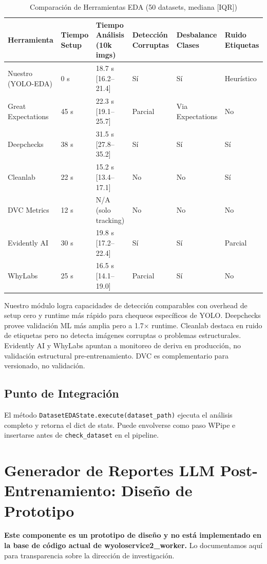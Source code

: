 \documentclass[10pt,twocolumn,letterpaper]{article}
\begin{document}
\begin{table}[htbp]
\centering
\caption{Comparación de Herramientas EDA (50 datasets, mediana [IQR])}
\label{tab:eda_compare}
\begin{tabular}{@{}llllll@{}}
\toprule
Herramienta & Tiempo Setup & Tiempo Análisis (10k imgs) & Detección Corruptas & Desbalance Clases & Ruido Etiquetas \\ \midrule
Nuestro (YOLO-EDA) & 0 s & 18.7 s [16.2--21.4] & Sí & Sí & Heurístico \\
Great Expectations & 45 s & 22.3 s [19.1--25.7] & Parcial & Via Expectations & No \\
Deepchecks & 38 s & 31.5 s [27.8--35.2] & Sí & Sí & Sí \\
Cleanlab & 22 s & 15.2 s [13.4--17.1] & No & No & Sí \\
DVC Metrics & 12 s & N/A (solo tracking) & No & No & No \\
Evidently AI & 30 s & 19.8 s [17.2--22.4] & Sí & Sí & Parcial \\
WhyLabs & 25 s & 16.5 s [14.1--19.0] & Parcial & Sí & No \\ \bottomrule
\end{tabular}
\end{table}

Nuestro módulo logra capacidades de detección comparables con overhead de setup cero y runtime más rápido para chequeos específicos de YOLO. Deepchecks provee validación ML más amplia pero a 1.7$\times$ runtime. Cleanlab destaca en ruido de etiquetas pero no detecta imágenes corruptas o problemas estructurales. Evidently AI y WhyLabs apuntan a monitoreo de deriva en producción, no validación estructural pre-entrenamiento. DVC es complementario para versionado, no validación.

\subsection{Punto de Integración}
El método \texttt{DatasetEDAState.execute(dataset\_path)} ejecuta el análisis completo y retorna el dict de stats. Puede envolverse como paso WPipe e insertarse antes de \texttt{check\_dataset} en el pipeline.

\section{Generador de Reportes LLM Post-Entrenamiento: Diseño de Prototipo}
\label{sec:llm_prototype}
\textbf{Este componente es un prototipo de diseño y no está implementado en la base de código actual de wyoloservice2\_worker.} Lo documentamos aquí para transparencia sobre la dirección de investigación.
\end{document}
